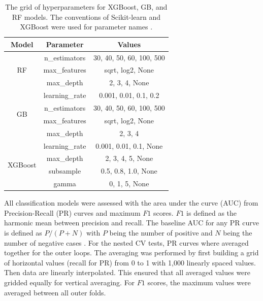 \documentclass[11pt,a4paper]{article}                                %
\begin{document}
\begin{table}[H]
\centering
\caption{The grid of hyperparameters for XGBoost, GB, and RF models. The conventions of Scikit-learn and XGBoost were used for parameter names \cite{scikit-learn, xgboost}.}
\begin{tabular}{|ccc|}

\hline
{Model}                 & {Parameter}   & {Values}                                \\
\hline
\hline

\multirow{3}{*}{RF}   & n\_estimators       & 30, 40, 50, 60, 100, 500            \\
                               & max\_features & sqrt, log2, None                 \\
                               & max\_depth              & 2, 3, 4, None          \\
                               
\hline

\multirow{4}{*}{GB}   & learning\_rate              & 0.001, 0.01, 0.1, 0.2       \\
                               & n\_estimators       & 30, 40, 50, 60, 100, 500   \\
                               & max\_features & sqrt, log2, None                 \\
                               & max\_depth              & 2, 3, 4                \\
\hline

\multirow{4}{*}{XGBoost}   & learning\_rate              & 0.001, 0.01, 0.1, None       \\
                           & max\_depth              & 2, 3, 4, 5, None                \\
                           & subsample              & 0.5, 0.8, 1.0, None                \\
                           & gamma              & 0, 1, 5, None                \\

\hline

\end{tabular}
\label{gridsearch}
\end{table}

\par
All classification models were assessed with the area under the curve (AUC) from Precision-Recall (PR) curves and maximum $F1$ scores. $F1$ is defined as the harmonic mean between precision and recall. The baseline AUC for any PR curve is defined as $P/(P+N)$ with $P$ being the number of positive and $N$ being the number of negative cases \cite{Saito2015}. For the nested CV tests, PR curves where averaged together for the outer loops. The averaging was performed by first building a grid of horizontal values (recall for PR) from 0 to 1 with 1,000 linearly spaced values. Then data are linearly interpolated. This ensured that all averaged values were gridded equally for vertical averaging. For $F1$ scores, the maximum values were averaged between all outer folds.
\end{document}
